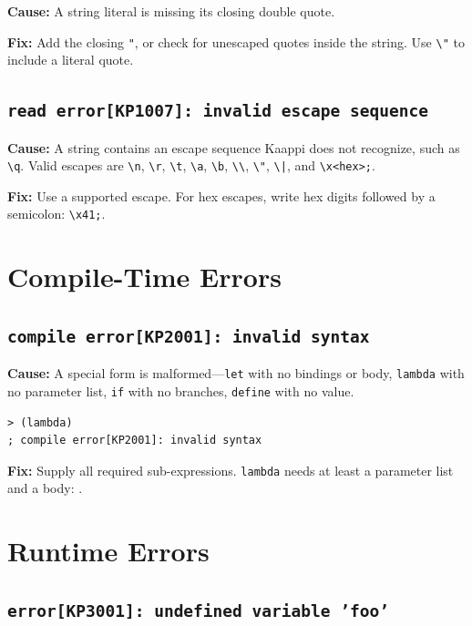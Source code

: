 \textbf{Cause:} A string literal is missing its closing double quote.

\textbf{Fix:} Add the closing \texttt{"}, or check for unescaped quotes inside the string. Use \texttt{\textbackslash"} to include a literal quote.

\subsection{\texttt{read error[KP1007]: invalid escape sequence}}

\textbf{Cause:} A string contains an escape sequence Kaappi does not recognize, such as \texttt{\textbackslash q}. Valid escapes are \texttt{\textbackslash n}, \texttt{\textbackslash r}, \texttt{\textbackslash t}, \texttt{\textbackslash a}, \texttt{\textbackslash b}, \texttt{\textbackslash\textbackslash}, \texttt{\textbackslash"}, \texttt{\textbackslash|}, and \texttt{\textbackslash x<hex>;}.

\textbf{Fix:} Use a supported escape. For hex escapes, write hex digits followed by a semicolon: \texttt{\textbackslash x41;}.

\section{Compile-Time Errors}

\subsection{\texttt{compile error[KP2001]: invalid syntax}}

\textbf{Cause:} A special form is malformed---\texttt{let} with no bindings or body, \texttt{lambda} with no parameter list, \texttt{if} with no branches, \texttt{define} with no value.

\begin{lstlisting}[style=repl]
> (lambda)
; compile error[KP2001]: invalid syntax
\end{lstlisting}

\textbf{Fix:} Supply all required sub-expressions. \texttt{lambda} needs at least a parameter list and a body: .

\section{Runtime Errors}

\subsection{\texttt{error[KP3001]: undefined variable 'foo'}}

